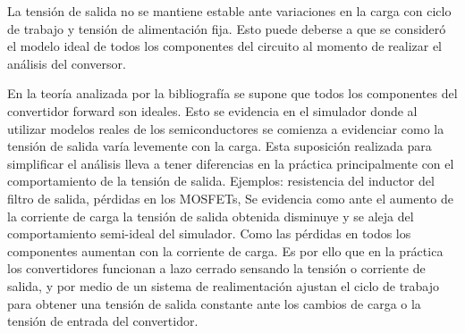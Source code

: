 La tensión de salida no se mantiene estable ante variaciones en la carga con ciclo de trabajo y tensión de alimentación fija. 
Esto puede deberse a que se consideró el modelo ideal de todos los componentes del circuito al momento de realizar el análisis del conversor. 

En la teoría analizada por la bibliografía se supone que todos los componentes del convertidor forward son ideales. 
Esto se evidencia en el simulador donde al utilizar modelos reales de los semiconductores se comienza a evidenciar como la tensión de salida varía levemente con la carga. 
Esta suposición realizada para simplificar el análisis lleva a tener diferencias en la práctica principalmente con el comportamiento de la tensión de salida. 
Ejemplos: resistencia del inductor del filtro de salida, pérdidas en los MOSFETs,
Se evidencia como ante el aumento de la corriente de carga la tensión de salida obtenida disminuye y se aleja del comportamiento semi-ideal del simulador. 
Como las pérdidas en todos los componentes aumentan con la corriente de carga. 
Es por ello que en la práctica los convertidores funcionan a lazo cerrado sensando la tensión o corriente de salida, y por medio de un sistema de realimentación ajustan el ciclo de trabajo para obtener una tensión de salida constante ante los cambios de carga o la tensión de entrada del convertidor.